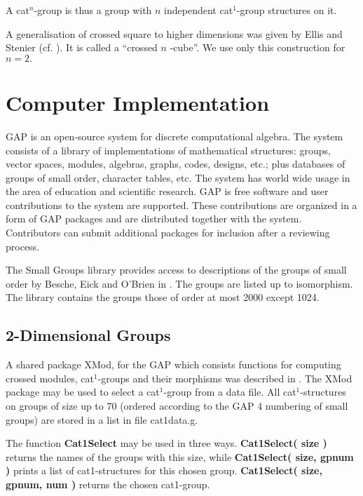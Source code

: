 \documentclass[a4paper,11pt]{article}
\theoremstyle{plain}
\theoremstyle{definition}
\begin{document}
A cat$^{n}$-group is thus a group with $n$ independent cat$^{1}$-group 
structures on it.

A generalisation of crossed square to higher dimensions was given by Ellis
and Stenier (cf. \cite{Sten}). It is called a \textquotedblleft crossed $n$%
-cube\textquotedblright . We use only this construction for $n=2.$

\section{Computer Implementation}

\textsf{GAP} \cite{gap} is an open-source system for discrete computational
algebra. The system consists of a library of implementations of mathematical
structures: groups, vector spaces, modules, algebras, graphs, codes,
designs, etc.; plus databases of groups of small order, character tables,
etc. The system has world wide usage in the area of education and scientific
research. \textsf{GAP} is free software and user contributions to the system
are supported. These contributions are organized in a form of \textsf{GAP}
packages and are distributed together with the system. Contributors can
submit additional packages for inclusion after a reviewing process.

The Small Groups library provides access to descriptions of the groups of
small order by Besche, Eick and O'Brien in \cite{bettina}. The groups are
listed up to isomorphism. The library contains the groups those of order at
most 2000 except 1024.


\subsection{2-Dimensional Groups}

A shared package \textsf{XMod}, for the \textsf{GAP} which consists
functions for computing crossed modules, cat$^{1}$-groups and their
morphisms was described in \cite{alp3}. The \textsf{XMod} package may be
used to select a cat$^{1}$-group from a data file. All cat$^{1}$-structures
on groups of size up to 70 (ordered according to the GAP 4 numbering of
small groups) are stored in a list in file cat1data.g.

The function \textbf{Cat1Select} may be used in three ways. \textbf{%
	Cat1Select( size )} returns the names of the groups with this size, while
\textbf{Cat1Select( size, gpnum )} prints a list of cat1-structures for this
chosen group. \textbf{Cat1Select( size, gpnum, num )} returns the chosen
cat1-group.
\end{document}
